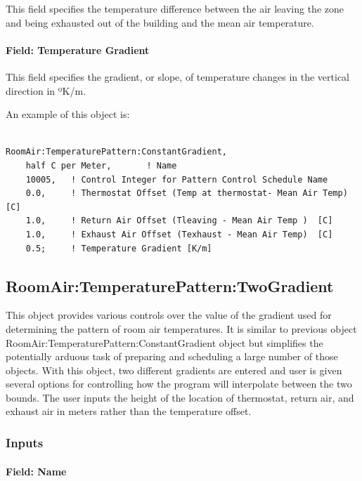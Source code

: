 This field specifies the temperature difference between the air leaving the zone and being exhausted out of the building and the mean air temperature.

\paragraph{Field: Temperature Gradient}\label{field-temperature-gradient}

This field specifies the gradient, or slope, of temperature changes in the vertical direction in ºK/m.

An example of this object is:

\begin{lstlisting}

RoomAir:TemperaturePattern:ConstantGradient,
    half C per Meter,       ! Name
    10005,   ! Control Integer for Pattern Control Schedule Name
    0.0,     ! Thermostat Offset (Temp at thermostat- Mean Air Temp) [C]
    1.0,     ! Return Air Offset (Tleaving - Mean Air Temp )  [C]
    1.0,     ! Exhaust Air Offset (Texhaust - Mean Air Temp)  [C]
    0.5;     ! Temperature Gradient [K/m]
\end{lstlisting}

\subsection{RoomAir:TemperaturePattern:TwoGradient}\label{roomairtemperaturepatterntwogradient}

This object provides various controls over the value of the gradient used for determining the pattern of room air temperatures. It is similar to previous object RoomAir:TemperaturePattern:ConstantGradient object but simplifies the potentially arduous task of preparing and scheduling a large number of those objects. With this object, two different gradients are entered and user is given several options for controlling how the program will interpolate between the two bounds. The user inputs the height of the location of thermostat, return air, and exhaust air in meters rather than the temperature offset.

\subsubsection{Inputs}\label{inputs-3-031}

\paragraph{Field: Name}\label{field-name-3-027}


